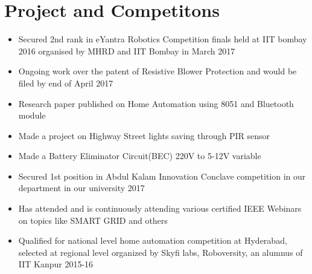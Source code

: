 \documentclass[]{article}
\begin{document}
\section{Project and Competitons }
\begin{itemize}
\item Secured 2nd rank in eYantra Robotics Competition finals held at IIT bombay 2016 organised by MHRD and IIT Bombay in March 2017
\item Ongoing work over the patent of Resistive Blower Protection and would be filed by end of April 2017
\item Research paper published on Home Automation using 8051 and Bluetooth module
\item Made a project on Highway Street lights saving through PIR sensor 
\item Made a Battery Eliminator Circuit(BEC) 220V to 5-12V variable
\item Secured 1st position in Abdul Kalam Innovation Conclave competition in our department in our university 2017
\item Has attended and is continuously attending various certified IEEE Webinars on topics like SMART GRID and others
\item Qualified for national level home automation competition at Hyderabad, selected at regional level organized by Skyfi labs, Roboversity, an alumnus of IIT Kanpur 2015-16 
\end{itemize}
\end{document}
